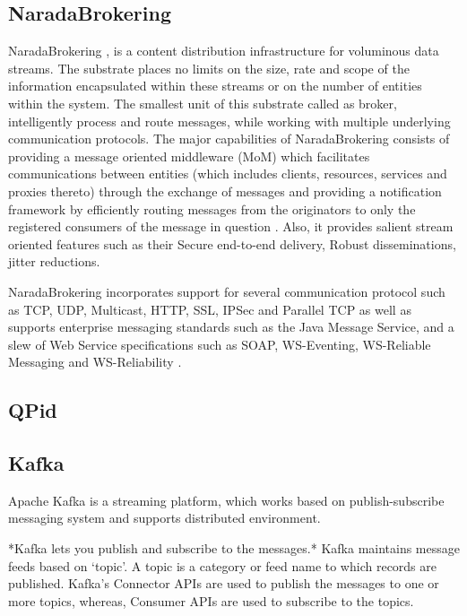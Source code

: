\subsection{ NaradaBrokering}

     NaradaBrokering \cite{www-narada}, is a content distribution
     infrastructure for voluminous data streams. The substrate places
     no limits on the size, rate and scope of the information
     encapsulated within these streams or on the number of entities
     within the system. The smallest unit of this substrate called as
     broker, intelligently process and route messages, while working
     with multiple underlying communication protocols. The major
     capabilities of NaradaBrokering consists of providing a message
     oriented middleware (MoM) which facilitates communications
     between entities (which includes clients, resources, services and
     proxies thereto) through the exchange of messages and providing a
     notification framework by efficiently routing messages from the
     originators to only the registered consumers of the message in
     question \cite{paper-nb-sustrate}. Also, it provides salient
     stream oriented features such as their Secure end-to-end
     delivery, Robust disseminations, jitter reductions.

     NaradaBrokering incorporates support for several communication
     protocol such as TCP, UDP, Multicast, HTTP, SSL, IPSec and
     Parallel TCP as well as supports enterprise messaging standards
     such as the Java Message Service, and a slew of Web Service
     specifications such as SOAP, WS-Eventing, WS-Reliable Messaging
     and WS-Reliability \cite{www-narada-features}.

     
\subsection{ QPid}
\subsection{ Kafka}

     Apache Kafka is a streaming platform, which works based on
     publish-subscribe messaging system and supports distributed
     environment.
      
     *Kafka lets you publish and subscribe to the messages.* Kafka
     maintains message feeds based on ‘topic’. A topic is a category
     or feed name to which records are published. Kafka’s Connector
     APIs are used to publish the messages to one or more topics,
     whereas, Consumer APIs are used to subscribe to the topics.

